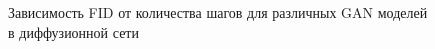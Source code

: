 \documentclass{article}
\begin{document}
\begin{figure}[H]	
	\caption{Зависимость FID от количества шагов для различных GAN моделей в диффузионной сети}\label{ddgan_all_fid}
\end{figure}
\end{document}
